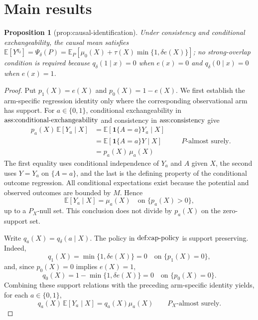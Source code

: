 \documentclass{article}
\newtheorem{proposition}{Proposition}
\begin{document}
\section{Main results}

\begin{proposition}[prop:causal-identification]\label{prop:causal-identification}
Under consistency and conditional exchangeability, the causal mean satisfies \(\mathbb E[Y^{q_\delta}]=\Psi_\delta(P)=\mathbb E_P[\mu_0(X)+\tau(X)\min\{1,\delta e(X)\}]\); no strong-overlap condition is required because \(q_\delta(1\mid x)=0\) when \(e(x)=0\) and \(q_\delta(0\mid x)=0\) when \(e(x)=1\).
\end{proposition}
\begin{proof}
Put \(p_1(X)=e(X)\) and \(p_0(X)=1-e(X)\).  We first establish the arm-specific regression identity only where the corresponding observational arm has support.  For \(a\in\{0,1\}\), conditional exchangeability in \(\textnormal{ass:conditional-exchangeability}\) and consistency in \(\textnormal{ass:consistency}\) give
\[
\begin{aligned}
 p_a(X)\,\mathbb E[Y_a\mid X]
 &=\mathbb E[\mathbf 1\{A=a\}Y_a\mid X] \\
 &=\mathbb E[\mathbf 1\{A=a\}Y\mid X] \\
 &=p_a(X)\,\mu_a(X)
\end{aligned}
\qquad P\text{-almost surely}.
\]
The first equality uses conditional independence of \(Y_a\) and \(A\) given \(X\), the second uses \(Y=Y_a\) on \(\{A=a\}\), and the last is the defining property of the conditional outcome regression.  All conditional expectations exist because the potential and observed outcomes are bounded by \(M\).  Hence
\[
\mathbb E[Y_a\mid X]=\mu_a(X)
\quad\text{on }\{p_a(X)>0\},
\]
up to a \(P_X\)-null set.  This conclusion does not divide by \(p_a(X)\) on the zero-support set.

Write \(q_a(X)=q_\delta(a\mid X)\).  The policy in \(\textnormal{def:cap-policy}\) is support preserving.  Indeed,
\[
q_1(X)=\min\{1,\delta e(X)\}=0\quad\text{on }\{p_1(X)=0\},
\]
and, since \(p_0(X)=0\) implies \(e(X)=1\),
\[
q_0(X)=1-\min\{1,\delta e(X)\}=0\quad\text{on }\{p_0(X)=0\}.
\]
Combining these support relations with the preceding arm-specific identity yields, for each \(a\in\{0,1\}\),
\[
q_a(X)\,\mathbb E[Y_a\mid X]=q_a(X)\mu_a(X)
\qquad P_X\text{-almost surely}.
\]


\end{proof}
\end{document}
